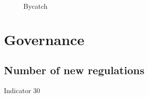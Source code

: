 \documentclass[
  letterpaper,
  oneside,
  open=any]{scrbook}
\begin{document}
\begin{figure}


\caption{\label{fig-bycatch}Bycatch}

\end{figure}%

\section{Governance}\label{governance}

\subsection{Number of new regulations}\label{number-of-new-regulations}

Indicator 30
\end{document}
